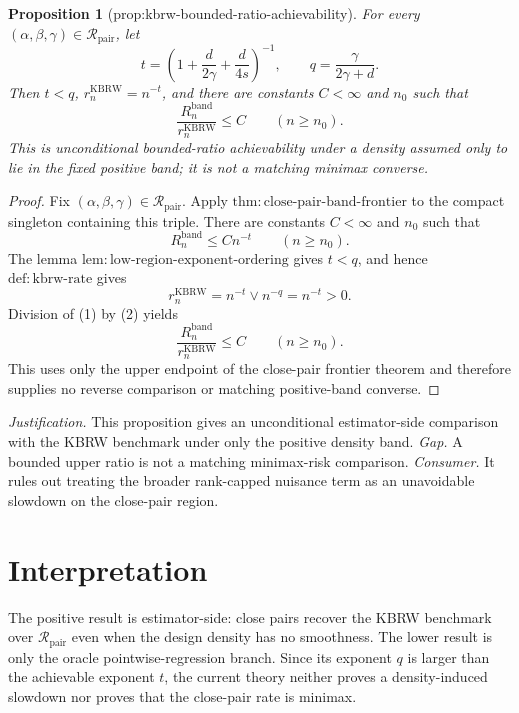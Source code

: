 \documentclass{article}
\newtheorem{proposition}{Proposition}
\begin{document}
\begin{proposition}[prop:kbrw-bounded-ratio-achievability]\label{prop:kbrw-bounded-ratio-achievability}
For every \((\alpha,\beta,\gamma)\in\mathcal R_{\mathrm{pair}}\), let
\[
t=\left(1+\frac d{2\gamma}+\frac d{4s}\right)^{-1},
\qquad q=\frac\gamma{2\gamma+d}.
\]
Then \(t<q\), \(r_n^{\mathrm{KBRW}}=n^{-t}\), and there are constants
\(C<\infty\) and \(n_0\) such that
\[
\frac{R_n^{\mathrm{band}}}{r_n^{\mathrm{KBRW}}}\leq C
\qquad(n\geq n_0).
\]
This is unconditional bounded-ratio achievability under a density assumed only
to lie in the fixed positive band; it is not a matching minimax converse.
\end{proposition}
\begin{proof}
Fix \((\alpha,\beta,\gamma)\in\mathcal R_{\mathrm{pair}}\).  Apply
\(\mathrm{thm:close\mbox{-}pair\mbox{-}band\mbox{-}frontier}\) to the
compact singleton containing this triple.  There are constants
\(C<\infty\) and \(n_0\) such that
\[
R_n^{\mathrm{band}}\leq Cn^{-t}
\qquad(n\geq n_0).
\tag{1}
\]
The lemma
\(\mathrm{lem:low\mbox{-}region\mbox{-}exponent\mbox{-}ordering}\) gives
\(t<q\), and hence \(\mathrm{def:kbrw\mbox{-}rate}\) gives
\[
r_n^{\mathrm{KBRW}}=n^{-t}\vee n^{-q}=n^{-t}>0.
\tag{2}
\]
Division of (1) by (2) yields
\[
\frac{R_n^{\mathrm{band}}}{r_n^{\mathrm{KBRW}}}\leq C
\qquad(n\geq n_0).
\]
This uses only the upper endpoint of the close-pair frontier theorem and
therefore supplies no reverse comparison or matching positive-band converse.
\end{proof}
\par\smallskip\noindent \textit{Justification.} This proposition gives an unconditional estimator-side comparison with the KBRW benchmark under only the positive density band. \textit{Gap.} A bounded upper ratio is not a matching minimax-risk comparison. \textit{Consumer.} It rules out treating the broader rank-capped nuisance term as an unavoidable slowdown on the close-pair region.

\section{Interpretation}

The positive result is estimator-side: close pairs recover the KBRW benchmark over \(\mathcal R_{\mathrm{pair}}\) even when the design density has no smoothness.  The lower result is only the oracle pointwise-regression branch.  Since its exponent \(q\) is larger than the achievable exponent \(t\), the current theory neither proves a density-induced slowdown nor proves that the close-pair rate is minimax.
\end{document}
